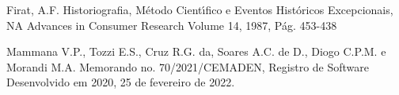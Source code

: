 \documentclass[
12pt,		%
openright,	%
twoside,  %
a4paper,			%
chapter=TITLE,		%
english,			%
french,				%
spanish,			%
brazil				%
]{USPSC-classe/USPSC}
\begin{document}
\begin{flushleft}
\begin{flushleft}
\begin{flushleft}
\begin{flushleft}
\begin{flushleft}
\begin{flushleft}
\begin{flushleft}
\begin{flushleft}
\begin{flushleft}
[Firat, 1987] Firat, A.F. Historiografia, M\'etodo Cient\'{\i}fico e Eventos Hist\'oricos Excepcionais, NA Advances in Consumer Research Volume 14, 1987, P\'ag. 453-438
\end{flushleft}


\end{flushleft}


\end{flushleft}


\end{flushleft}


\end{flushleft}


\end{flushleft}


\end{flushleft}


\end{flushleft}


\end{flushleft}


\begin{flushleft}
\begin{flushleft}
\begin{flushleft}
\begin{flushleft}
\begin{flushleft}
\begin{flushleft}
\begin{flushleft}
\begin{flushleft}
\begin{flushleft}
[MAMMANA et al., 2022] Mammana V.P., Tozzi E.S., Cruz R.G. da, Soares A.C. de D., Diogo C.P.M. e Morandi M.A. Memorando no. 70/2021/CEMADEN, Registro de Software Desenvolvido em 2020, 25 de fevereiro de 2022.
\end{flushleft}


\end{flushleft}


\end{flushleft}


\end{flushleft}


\end{flushleft}


\end{flushleft}


\end{flushleft}


\end{flushleft}


\end{flushleft}
\end{document}
